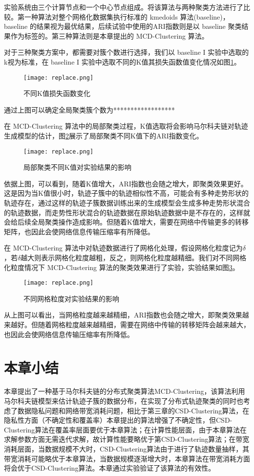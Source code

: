 实验系统由三个计算节点和一个中心节点组成。将该算法与两种聚类方法进行了比较。第一种算法对整个网格化数据集执行标准的 kmedoids 算法(baseline)， baseline 的结果视为最优结果，后续试验中使用的ARI指数则是以 baseline 聚类结果作为标签的。第三种算法则是本章提出的 MCD-Clustering 算法。

对于三种聚类方案中，都需要对簇个数进行选择，我们以 baseline I 实验中选取的k视为标准，在 baseline I 实验中选取不同的K值其损失函数值变化情况如图\ref{differentK}。
\begin{figure}[h]
	\texttt{[image: replace.png]}
	\caption{不同K值损失函数变化}
	\label{differentK}
\end{figure}

通过上图可以确定全局聚类簇个数为******************

在 MCD-Clustering 算法中的局部聚类过程，K值选取将会影响马尔科夫链对轨迹生成模型的估计，图\ref{differentKJB}展示了局部聚类不同K值下的ARI指数变化。
\begin{figure}[h]
	\texttt{[image: replace.png]}
	\caption{局部聚类不同K值对实验结果的影响}
	\label{differentKJB}
\end{figure}

依据上图，可以看到，随着K值增大，ARI指数也会随之增大，即聚类效果更好。这是因为当K值很小时，轨迹子簇中的轨迹相似性不高，可能会有多种走势形状的轨迹存在，通过这样的轨迹子簇数据训练出来的生成模型会生成多种走势形状混合的轨迹数据，而走势性形状混合的轨迹数据在原始轨迹数据中是不存在的，这样就会给后续全局聚类操作造成影响。但随着K值增大，需要在网络中传输更多的转移矩阵，也因此会使网络信息传输压缩率有所降低。

在 MCD-Clustering 算法中对轨迹数据进行了网格化处理，假设网格化粒度记为$\delta$，若$\delta$越大则表示网格化粒度越粗，反之，则网格化粒度越精细。我们对不同网格化粒度情况下 MCD-Clustering 算法的聚类效果进行了实验，实验结果如图\ref{differentDELTA}。
\begin{figure}[h]
	\texttt{[image: replace.png]}
	\caption{不同网格粒度对实验结果的影响}
	\label{differentDELTA}
\end{figure}

从上图可以看出，当网格粒度越来越精细，ARI指数也会随之增大，即聚类效果越来越好。但随着网格粒度越来越精细，需要在网络中传输的转移矩阵会越来越大，也因此会使网络信息传输压缩率有所降低。


\section{本章小结}

本章提出了一种基于马尔科夫链的分布式聚类算法MCD-Clustering，该算法利用马尔科夫链模型来估计轨迹子簇的数据分布，在实现了分布式轨迹聚类的同时也考虑了数据隐私问题和网络带宽消耗问题，相比于第三章的CSD-Clustering算法，在隐私性方面（不确定性和覆盖率）本章提出的算法增强了不确定性，但CSD-Clustering算法在覆盖率层面要优于本章算法；在计算性能层面，由于本章算法在求解参数方面无需迭代求解，故计算性能要略优于第CSD-Clustering算法；在带宽消耗层面，当数据规模不大时，CSD-Clustering算法由于进行了轨迹数量抽样，其带宽消耗可能略优于本章算法，当数据规模逐渐增大时，本章算法在带宽消耗方面将会优于CSD-Clustering算法。本章通过实验验证了该算法的有效性。
